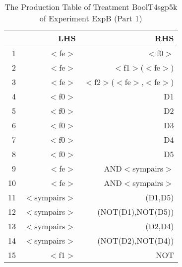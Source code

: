 \begin{table}[ht]
\centering
\begin{tabular}{rrr}
  \hline
 & LHS & RHS \\ 
  \hline
1 & $<$fe$>$ & $<$f0$>$ \\ 
  2 & $<$fe$>$ & $<$f1$>$($<$fe$>$) \\ 
  3 & $<$fe$>$ & $<$f2$>$($<$fe$>$,$<$fe$>$) \\ 
  4 & $<$f0$>$ & D1 \\ 
  5 & $<$f0$>$ & D2 \\ 
  6 & $<$f0$>$ & D3 \\ 
  7 & $<$f0$>$ & D4 \\ 
  8 & $<$f0$>$ & D5 \\ 
  9 & $<$fe$>$ & AND$<$sympairs$>$ \\ 
  10 & $<$fe$>$ & AND$<$sympairs$>$ \\ 
  11 & $<$sympairs$>$ & (D1,D5) \\ 
  12 & $<$sympairs$>$ & (NOT(D1),NOT(D5)) \\ 
  13 & $<$sympairs$>$ & (D2,D4) \\ 
  14 & $<$sympairs$>$ & (NOT(D2),NOT(D4)) \\ 
  15 & $<$f1$>$ & NOT \\ 
   \hline
\end{tabular}
\caption{The Production Table of Treatment BoolT4sgp5k of Experiment ExpB (Part 1)} 
\end{table}
